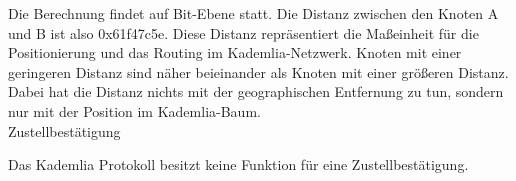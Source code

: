 \noindent Die Berechnung findet auf Bit-Ebene statt. Die Distanz zwischen den Knoten A und B
ist also 0x61f47c5e.
Diese Distanz repräsentiert die Maßeinheit für die Positionierung und das Routing 
im Kademlia-Netzwerk. Knoten mit einer geringeren Distanz sind näher beieinander
als Knoten mit einer größeren Distanz. Dabei hat die Distanz nichts mit der
geographischen Entfernung zu tun, sondern nur mit der Position im Kademlia-Baum.
\\

\noindent Zustellbestätigung

\noindent Das Kademlia Protokoll besitzt keine Funktion für eine Zustellbestätigung.